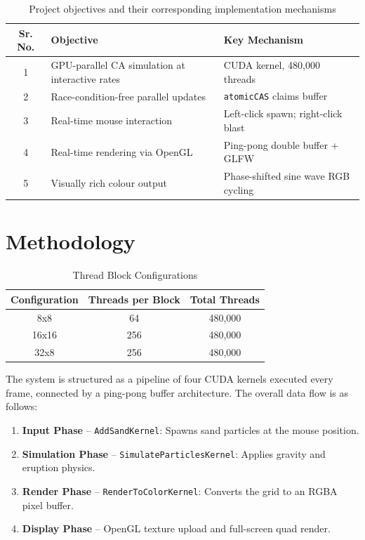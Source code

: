 \documentclass[12pt,a4paper]{article}
\begin{document}
    \begin{table}[h]
    \centering
    \begin{tabular}{|c|p{6cm}|p{5cm}|}
    \hline
    \textbf{Sr. No.} & \textbf{Objective} & \textbf{Key Mechanism} \\
    \hline
    1 & GPU-parallel CA simulation at interactive rates & CUDA kernel, 480,000 threads \\
    \hline
    2 & Race-condition-free parallel updates & \texttt{atomicCAS} claims buffer \\
    \hline
    3 & Real-time mouse interaction & Left-click spawn; right-click blast \\
    \hline
    4 & Real-time rendering via OpenGL & Ping-pong double buffer + GLFW \\
    \hline
    5 & Visually rich colour output & Phase-shifted sine wave RGB cycling \\
    \hline
    \end{tabular}
    \caption{Project objectives and their corresponding implementation mechanisms}
    \label{Table:objectives}
    \end{table}


	\newpage
	\section{Methodology}
    \begin{table}[h]
    \centering
    \begin{tabular}{|c|c|c|}
    \hline
    Configuration & Threads per Block & Total Threads \\
    \hline
    8x8 & 64 & 480,000 \\
    16x16 & 256 & 480,000 \\
    32x8 & 256 & 480,000 \\
    \hline
    \end{tabular}
    \caption{Thread Block Configurations}
    \end{table}

    The system is structured as a pipeline of four CUDA kernels executed every frame, connected by 
    a ping-pong buffer architecture. The overall data flow is as follows:

    \begin{enumerate}
        \item \textbf{Input Phase} -- \texttt{AddSandKernel}: Spawns sand particles at the mouse position.
        \item \textbf{Simulation Phase} -- \texttt{SimulateParticlesKernel}: Applies gravity and eruption physics.
        \item \textbf{Render Phase} -- \texttt{RenderToColorKernel}: Converts the grid to an RGBA pixel buffer.
        \item \textbf{Display Phase} -- OpenGL texture upload and full-screen quad render.
    \end{enumerate}
\end{document}

